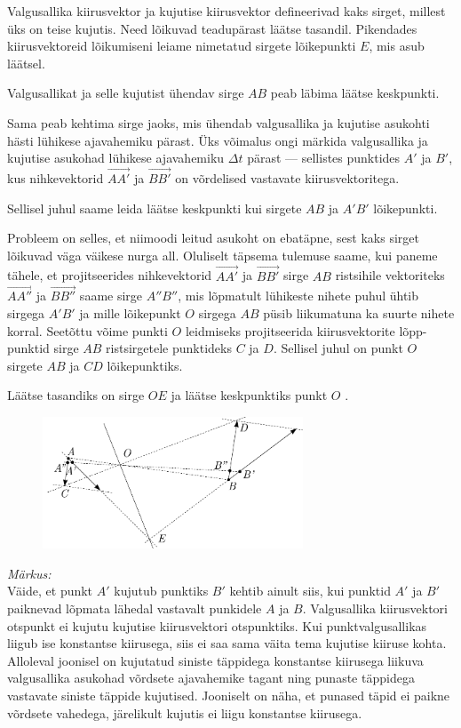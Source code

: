\solu
Valgusallika kiirusvektor ja kujutise kiirusvektor defineerivad kaks sirget, millest üks on teise kujutis. Need lõikuvad teadupärast läätse tasandil. Pikendades kiirusvektoreid lõikumiseni leiame nimetatud sirgete lõikepunkti $E$, mis asub läätsel.  \par
Valgusallikat ja selle kujutist ühendav sirge $AB$ peab läbima läätse keskpunkti.  \par
Sama peab kehtima sirge jaoks, mis ühendab valgusallika ja kujutise asukohti hästi lühikese ajavahemiku pärast. Üks võimalus ongi märkida valgusallika ja kujutise asukohad lühikese ajavahemiku $\Delta t$ pärast --- sellistes punktides $A'$ ja $B'$, kus nihkevektorid  $\vec{AA'}$ ja $\vec{BB'}$ on võrdelised vastavate kiirusvektoritega.  \par
Sellisel juhul saame leida läätse keskpunkti kui sirgete $AB$ ja $A'B'$ lõikepunkti.  \par
Probleem on selles, et niimoodi leitud asukoht on ebatäpne, sest kaks sirget lõikuvad väga väikese nurga all. Oluliselt täpsema tulemuse saame, kui paneme tähele, et projitseerides nihkevektorid $\vec{AA'}$ ja $\vec{BB'}$ sirge $AB$ ristsihile vektoriteks $\vec{AA''}$ ja $\vec{BB''}$ saame sirge $A''B''$, mis  lõpmatult lühikeste nihete puhul ühtib sirgega $A'B'$ ja mille lõikepunkt $O$ sirgega $AB$ püsib liikumatuna ka suurte nihete korral. Seetõttu võime punkti $O$ leidmiseks projitseerida kiirusvektorite lõpp-punktid sirge $AB$ ristsirgetele punktideks $C$ ja $D$. Sellisel juhul on punkt $O$ sirgete $AB$ ja $CD$ lõikepunktiks.  \par
Läätse tasandiks on sirge $OE$ ja läätse keskpunktiks punkt $O$ .
\begin{figure}[H]
  \centering
  \includegraphics[width=0.69\textwidth]{2021-v2g-09-yl.pdf}
\end{figure}

\emph{Märkus:} \\
Väide, et punkt $A'$ kujutub punktiks $B'$ kehtib ainult siis, kui punktid $A'$ ja $B'$ paiknevad lõpmata lähedal vastavalt punkidele $A$ ja $B$. Valgusallika kiirusvektori otspunkt ei kujutu kujutise kiirusvektori otspunktiks. Kui punktvalgusallikas liigub ise konstantse kiirusega, siis ei saa sama väita tema kujutise kiiruse kohta. Alloleval joonisel on kujutatud siniste täppidega konstantse kiirusega liikuva valgusallika asukohad võrdsete ajavahemike tagant ning punaste täppidega vastavate siniste täppide kujutised. Jooniselt on näha, et punased täpid ei paikne võrdsete vahedega, järelikult kujutis ei liigu konstantse kiirusega.


